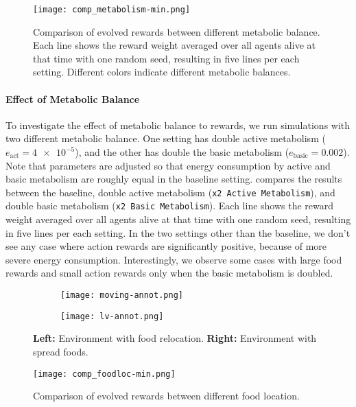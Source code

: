 \begin{figure}[t]
  \centering
  \texttt{[image: comp\_metabolism-min.png]}
  \caption{
    Comparison of evolved rewards between different metabolic balance.
    Each line shows the reward weight averaged over all agents alive at that time with one random seed, resulting in five lines per each setting.
    Different colors indicate different metabolic balances.
  }\label{figure:result-metabolism}
\end{figure}

\paragraph{Effect of Metabolic Balance}
To investigate the effect of metabolic balance to rewards, we run simulations with two different metabolic balance. One setting has double active metabolism ($e_{\mathrm{act}} = \num{4e-5}$), and the other has double the basic metabolism ($e_{\mathrm{basic}} = 0.002$). Note that parameters are adjusted so that energy consumption by active and basic metabolism are roughly equal in the baseline setting.
 compares the results between the baseline, double active metabolism (\texttt{x2 Active Metabolism}), and double basic metabolism (\texttt{x2 Basic Metabolism}). Each line shows the reward weight averaged over all agents alive at that time with one random seed, resulting in five lines per each setting. In the two settings other than the baseline, we don't see any case where action rewards are significantly positive, because of more severe energy consumption.
Interestingly, we observe some cases with large food rewards and small action rewards only when the basic metabolism is doubled.

\begin{figure}[t]
  \begin{subfigure}[t]{4cm}
    \centering
    \texttt{[image: moving-annot.png]}
  \end{subfigure}
  \begin{subfigure}[t]{4cm}
    \centering
    \texttt{[image: lv-annot.png]}
  \end{subfigure}
  \caption{
    \textbf{Left:} Environment with food relocation.
    \textbf{Right:} Environment with spread foods.
  }\label{figure:foodloc}
\end{figure}

\begin{figure}[t]
  \centering
  \texttt{[image: comp\_foodloc-min.png]}
  \caption{
    Comparison of evolved rewards between different food location.
  }\label{figure:result-foodloc}
\end{figure}

